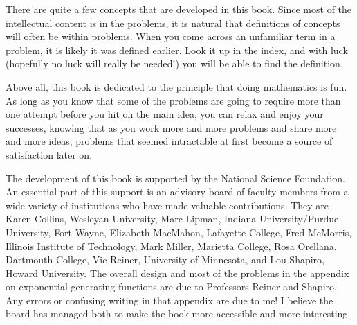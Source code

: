 \documentclass[10pt,]{book}
\theoremstyle{plain}
\theoremstyle{definition}
\numberwithin{equation}{chapter}
\begin{document}
\par
There are quite a few concepts that are developed in this book. Since most of the intellectual content is in the problems, it is natural that definitions of concepts will often be within problems. When you come across an unfamiliar term in a problem, it is likely it was defined earlier. Look it up in the index, and with luck (hopefully no luck will really be needed!) you will be able to find the definition.%
\par
Above all, this book is dedicated to the principle that doing mathematics is fun. As long as you know that some of the problems are going to require more than one attempt before you hit on the main idea, you can relax and enjoy your successes, knowing that as you work more and more problems and share more and more ideas, problems that seemed intractable at first become a source of satisfaction later on.%
\par
The development of this book is supported by the National Science Foundation. An essential part of this support is an advisory board of faculty members from a wide variety of institutions who have made valuable contributions. They are Karen Collins, Wesleyan University, Marc Lipman, Indiana University/Purdue University, Fort Wayne, Elizabeth MacMahon, Lafayette College, Fred McMorris, Illinois Institute of Technology, Mark Miller, Marietta College, Rosa Orellana, Dartmouth College, Vic Reiner, University of Minnesota, and Lou Shapiro, Howard University. The overall design and most of the problems in the appendix on exponential generating functions are due to Professors Reiner and Shapiro. Any errors or confusing writing in that appendix are due to me! I believe the board has managed both to make the book more accessible and more interesting.%
\setcounter{tocdepth}{2}
\renewcommand*\contentsname{Contents}
\tableofcontents
\mainmatter
\typeout{************************************************}
\typeout{************************************************}
\end{document}
